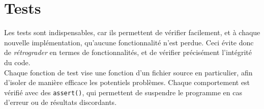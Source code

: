 \section{Tests}

Les tests sont indispensables, car ils permettent de vérifier facilement, et à chaque nouvelle implémentation, qu'aucune fonctionnalité n'est perdue. Ceci évite donc de \textit{rétrograder} en termes de fonctionnalités, et de vérifier précisément l'intégrité du code. \\
Chaque fonction de test vise une fonction d'un fichier source en particulier, afin d'isoler de manière efficace les potentiels problèmes. Chaque comportement est vérifié avec des \texttt{assert()}, qui permettent de suspendre le programme en cas d'erreur ou de résultats discordants. 